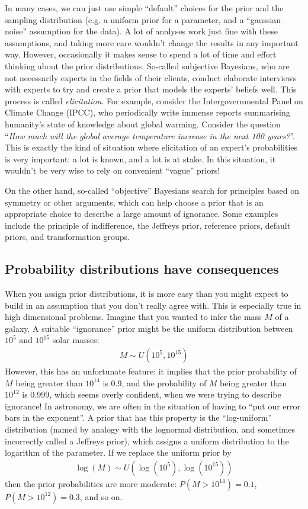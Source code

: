 In many cases, we can just use simple ``default'' choices for the prior and
the sampling distribution (e.g. a uniform prior for a parameter, and a
``gaussian noise'' assumption for the data). A lot of analyses work just fine
with these assumptions, and taking more care wouldn't change the results in
any important way. However, occasionally it makes sense to spend a lot of
time and effort thinking about the prior distributions.
So-called subjective Bayesians, who are not
necessarily experts in the fields of their clients, conduct elaborate interviews
with experts to try and create a prior that models the experts' beliefs well.
This process is called {\it elicitation}.
For example, consider the Intergovernmental Panel on Climate Change (IPCC),
who periodically write immense reports summarising humanity's state of knowledge
about global warming.
Consider the question ``{\it How much will the global average temperature
increase in the next 100 years?}''. This is exactly the kind of situation where
elicitation of an expert's probabilities is very important: a lot is known,
and a lot is at stake. In this situation, it wouldn't be very wise to rely on
convenient ``vague'' priors!

On the other hand, so-called ``objective'' Bayesians search for principles
based on symmetry or other arguments, which can help choose a prior that is
an appropriate choice to describe a large amount of ignorance. Some examples
include the principle of indifference, the Jeffreys prior, reference priors,
default priors, and transformation groups.

\subsection{Probability distributions have consequences}
When you assign prior distributions, it is more easy than you might expect to
build in an assumption that you don't really agree with. This is especially
true in high dimensional problems. Imagine that you wanted to infer the mass
$M$ of a galaxy. A suitable ``ignorance'' prior might be the uniform distribution
between $10^{5}$ and $10^{15}$ solar masses:
\begin{eqnarray}
M \sim U(10^{5}, 10^{15})
\end{eqnarray}
However, this has an unfortunate feature: it implies that the prior probability
of $M$ being greater than $10^{14}$ is 0.9, and the probability of $M$ being
greater than $10^{12}$ is 0.999, which seems overly confident, when we were
trying to describe ignorance! In astronomy,
we are often in the situation of having to ``put our error bars in the
exponent''. A prior that has this property is the ``log-uniform'' distribution
(named by analogy with the lognormal distribution, and sometimes incorrectly
called a Jeffreys prior), which assigns a uniform distribution to the logarithm
of the parameter. If we replace the uniform prior by
\begin{eqnarray}
\log(M) \sim U(\log(10^{5}), \log(10^{15}))
\end{eqnarray}
then the prior probabilities are more moderate: $P(M > 10^{14}) = 0.1$,
$P(M > 10^{12}) = 0.3$, and so on.



